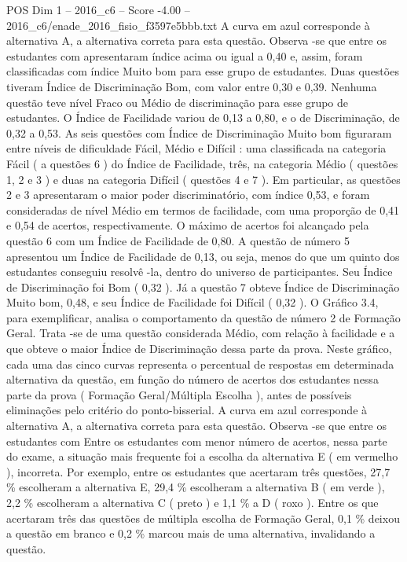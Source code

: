 \begin{textsample}{POS Dim 1 – 2016\_c6 – Score -4.00 – 2016\_c6/enade\_2016\_fisio\_f3597e5bbb.txt}
A curva em azul corresponde à alternativa A, a alternativa correta para esta questão.
Observa -se que entre os estudantes com apresentaram índice acima ou igual a 0,40 e, assim, foram classificadas com índice Muito bom para esse grupo de estudantes.
Duas questões tiveram Índice de Discriminação Bom, com valor entre 0,30 e 0,39.
Nenhuma questão teve nível Fraco ou Médio de discriminação para esse grupo de estudantes.
O Índice de Facilidade variou de 0,13 a 0,80, e o de Discriminação, de 0,32 a 0,53.
As seis questões com Índice de Discriminação Muito bom figuraram entre níveis de dificuldade Fácil, Médio e Difícil : uma classificada na categoria Fácil ( a questões 6 ) do Índice de Facilidade, três, na categoria Médio ( questões 1, 2 e 3 ) e duas na categoria Difícil ( questões 4 e 7 ).
Em particular, as questões 2 e 3 apresentaram o maior poder discriminatório, com índice 0,53, e foram consideradas de nível Médio em termos de facilidade, com uma proporção de 0,41 e 0,54 de acertos, respectivamente.
O máximo de acertos foi alcançado pela questão 6 com um Índice de Facilidade de 0,80.
A questão de número 5 apresentou um Índice de Facilidade de 0,13, ou seja, menos do que um quinto dos estudantes conseguiu resolvê -la, dentro do universo de participantes.
Seu Índice de Discriminação foi Bom ( 0,32 ).
Já a questão 7 obteve Índice de Discriminação Muito bom, 0,48, e seu Índice de Facilidade foi Difícil ( 0,32 ).
O Gráfico 3.4, para exemplificar, analisa o comportamento da questão de número 2 de Formação Geral.
Trata -se de uma questão considerada Médio, com relação à facilidade e a que obteve o maior Índice de Discriminação dessa parte da prova.
Neste gráfico, cada uma das cinco curvas representa o percentual de respostas em determinada alternativa da questão, em função do número de acertos dos estudantes nessa parte da prova ( Formação Geral/Múltipla Escolha ), antes de possíveis eliminações pelo critério do ponto-bisserial.
A curva em azul corresponde à alternativa A, a alternativa correta para esta questão.
Observa -se que entre os estudantes com Entre os estudantes com menor número de acertos, nessa parte do exame, a situação mais frequente foi a escolha da alternativa E ( em vermelho ), incorreta.
Por exemplo, entre os estudantes que acertaram três questões, 27,7 \% escolheram a alternativa E, 29,4 \% escolheram a alternativa B ( em verde ), 2,2 \% escolheram a alternativa C ( preto ) e 1,1 \% a D ( roxo ).
Entre os que acertaram três das questões de múltipla escolha de Formação Geral, 0,1 \% deixou a questão em branco e 0,2 \% marcou mais de uma alternativa, invalidando a questão.

\end{textsample}
